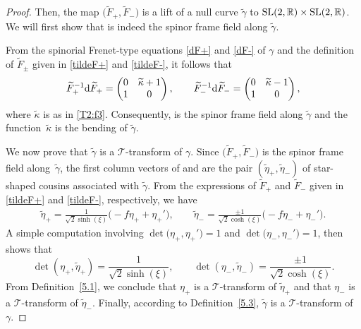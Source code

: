 \documentclass[10pt,a4paper]{amsart}
\numberwithin{equation}{section}
\def\bending{\kappa}
\def\R{\mathbb{R}}
\def\SL{{\rm SL}(2,\R)}
\begin{document}
\begin{proof}
	Then, the map $\bigl(\widetilde{F}_+,\widetilde{F}_-\bigr)$ is a lift of a null curve $\widetilde{\gamma}$ to $\SL\times\SL$. We will first show that  is indeed the spinor frame field along $\widetilde{\gamma}$.
	
	From the spinorial Frenet-type equations \eqref{dF+} and \eqref{dF-} of $\gamma$ and the definition of $\widetilde{F}_\pm$ given in \eqref{tildeF+} and \eqref{tildeF-}, it follows that
	\begin{gather*}
		\widetilde{F}_+^{-1}{\rm d}\widetilde{F}_+=\begin{pmatrix} 0 & \widetilde{\bending}+1 \\ 1 & 0 \end{pmatrix},\qquad
		\widetilde{F}_-^{-1}{\rm d}\widetilde{F}_-=\begin{pmatrix} 0 & \widetilde{\bending}-1 \\ 1 & 0 \end{pmatrix},
	\end{gather*}
	where $\widetilde{\bending}$ is as in \eqref{T2:f3}. Consequently,  is the spinor frame field along $\widetilde{\gamma}$ and the function~$\widetilde{\bending}$ is the bending of $\widetilde{\gamma}$.
	
	We now prove that $\widetilde{\gamma}$ is a $\mathcal{T}$-transform of $\gamma$. Since $\bigl(\widetilde{F}_+,\widetilde{F}_-\bigr)$ is the spinor frame field along~$\widetilde{\gamma}$, the first column vectors of  and  are the pair $(\widetilde{\eta}_+,\widetilde{\eta}_-)$ of star-shaped cousins associated with $\widetilde{\gamma}$. From the expressions of $\widetilde{F}_+$ and $\widetilde{F}_-$ given in \eqref{tildeF+} and \eqref{tildeF-}, respectively, we have
	\begin{gather*}
		\widetilde{\eta}_+=\frac{1}{\sqrt{2} \sinh(\xi)}\bigl(-f\eta_++\eta_+'\bigr),\qquad
		\widetilde{\eta}_-=\frac{\pm 1}{\sqrt{2} \cosh(\xi)}\bigl(-f\eta_-+\eta_-'\bigr).
	\end{gather*}
	A simple computation involving $\det \bigl(\eta_+,\eta_+'\bigr)=1$ and $\det \bigl(\eta_-,\eta_-'\bigr)=1$, then shows that
	\begin{equation*}
		\det (\eta_+,\widetilde{\eta}_+)=\frac{1}{\sqrt{2} \sinh(\xi)},\qquad \det (\eta_-,\widetilde{\eta}_-)=\frac{\pm 1}{\sqrt{2} \cosh(\xi)}.
	\end{equation*}
	From Definition~\ref{5.1}, we conclude that $\eta_+$ is a $\mathcal{T}$-transform of $\widetilde{\eta}_+$ and that $\eta_-$ is a $\mathcal{T}$-transform of $\widetilde{\eta}_-$. Finally, according to Definition~\ref{5.3}, $\widetilde{\gamma}$ is a $\mathcal{T}$-transform of $\gamma$.
\end{proof}
\end{document}
